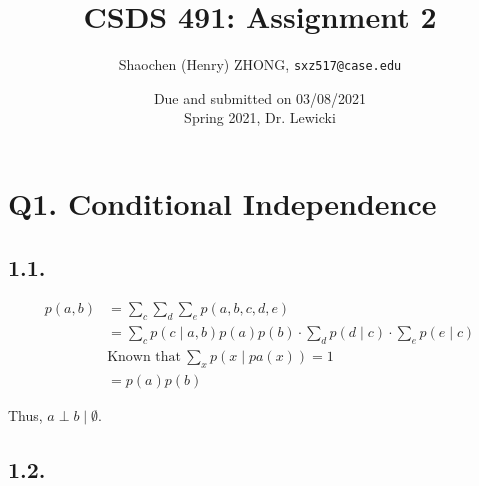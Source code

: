 \documentclass[11pt]{article}
\newcommand{\ilc}{\texttt}
\begin{document}
\title{\textbf{CSDS 491: Assignment 2}}

\author{Shaochen (Henry) ZHONG, \ilc{sxz517@case.edu}}

\date{Due and submitted on 03/08/2021 \\ Spring 2021, Dr. Lewicki}
\maketitle


%
%
%
%


\section*{Q1. Conditional Independence}

\subsection*{1.1.}

\begin{align*}
    p(a,b) &= \sum\limits_c \sum\limits_d \sum\limits_e p(a, b, c, d, e) \\
    &= \sum\limits_c  p(c \mid a, b) p(a)p(b) \cdot \sum\limits_d p(d \mid c) \cdot \sum\limits_e p(e \mid c) \\
    &\text{Known that} \ \sum\limits_{x} p(x \mid pa(x)) = 1 \\
    &= p(a)p(b)
\end{align*}

Thus, $a \perp b \mid \emptyset$.

\subsection*{1.2.}
\end{document}
